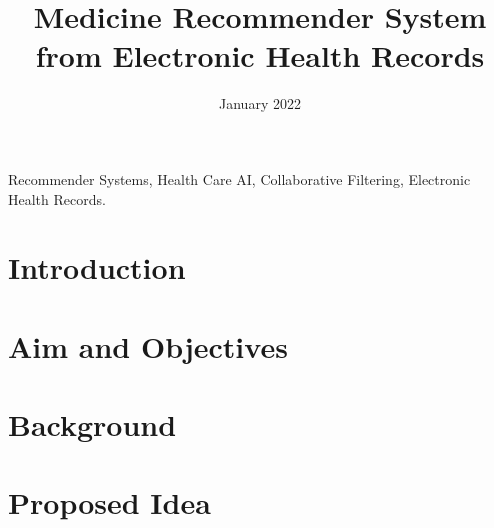 \documentclass[conference]{IEEEtran}
\begin{document}
\title{Medicine Recommender System from Electronic Health Records }

\author{
	\date{January 2022}
}

\maketitle

\begin{abstract}
    
\end{abstract}

\begin{IEEEkeywords}
    Recommender Systems, Health Care AI, Collaborative Filtering,
    Electronic Health Records.
\end{IEEEkeywords}

\section{Introduction}
    

\section{Aim and Objectives}
    

\section{Background}
    

\section{Proposed Idea}
    



\end{document}
